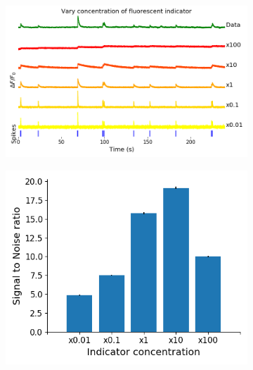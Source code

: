 \begin{figure}[p]
    \centering
    \begin{subfigure}{0.9\textwidth}
        \includegraphics[width=\linewidth]{figures/calcium_chapter/indicator_perturbed_fluorescence_18_paper.png}
        \caption{}
        \label{fig:indicator_perturbed_fluorescence}
    \end{subfigure}
    \newline
    \begin{subfigure}{0.45\textwidth}
        \includegraphics[width=\linewidth]{figures/calcium_chapter/indicator_perturbed_snr.png}
        \caption{}
        \label{fig:indicator_perturbed_snr}
    \end{subfigure}
    \begin{subfigure}{0.45\textwidth}

\end{subfigure}
\end{figure}
